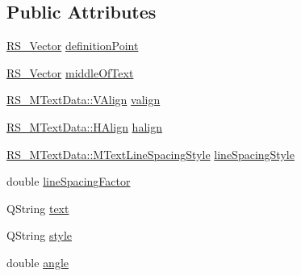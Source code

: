 \subsection*{Public Attributes}
\begin{DoxyCompactItemize}
\item 
\hyperlink{classRS__Vector}{R\-S\-\_\-\-Vector} \hyperlink{classRS__DimensionData_aaa0d4876e7fe6d387b614ce5061fd41b}{definition\-Point}
\item 
\hyperlink{classRS__Vector}{R\-S\-\_\-\-Vector} \hyperlink{classRS__DimensionData_a554e15e3d0387bf5d4b396b6fa2a55c0}{middle\-Of\-Text}
\item 
\hyperlink{classRS__MTextData_a9f1c092c22fc207e48e1f3f23b93d54f}{R\-S\-\_\-\-M\-Text\-Data\-::\-V\-Align} \hyperlink{classRS__DimensionData_a64f784647be6abf5e47fa6b20a8072dc}{valign}
\item 
\hyperlink{classRS__MTextData_ad819fe18c56a345fcfb205705c0445cc}{R\-S\-\_\-\-M\-Text\-Data\-::\-H\-Align} \hyperlink{classRS__DimensionData_a4dc9c4badabffec10a80cc6e145bbc4b}{halign}
\item 
\hyperlink{classRS__MTextData_ada9028cb480af4b0365164c6edd4a3ad}{R\-S\-\_\-\-M\-Text\-Data\-::\-M\-Text\-Line\-Spacing\-Style} \hyperlink{classRS__DimensionData_a259f4f13e239b33fecd8adcc59476d78}{line\-Spacing\-Style}
\item 
double \hyperlink{classRS__DimensionData_a68af239c4f73570483766d6b8f81ba53}{line\-Spacing\-Factor}
\item 
Q\-String \hyperlink{classRS__DimensionData_ae7806851498b4d88728e0d01b22a3d64}{text}
\item 
Q\-String \hyperlink{classRS__DimensionData_a8ba6161a65fdd25cd383baad9416ebc4}{style}
\item 
double \hyperlink{classRS__DimensionData_a7ef296ececae34dcbb9285010327d55f}{angle}
\end{DoxyCompactItemize}
